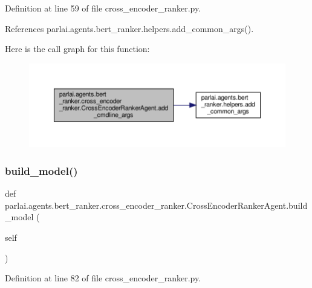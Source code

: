 Definition at line 59 of file cross\+\_\+encoder\+\_\+ranker.\+py.



References parlai.\+agents.\+bert\+\_\+ranker.\+helpers.\+add\+\_\+common\+\_\+args().

Here is the call graph for this function\+:
\nopagebreak
\begin{figure}[H]
\begin{center}
\leavevmode
\includegraphics[width=350pt]{classparlai_1_1agents_1_1bert__ranker_1_1cross__encoder__ranker_1_1CrossEncoderRankerAgent_a15c4f37715a216f5a4f37f5dbcb446f5_cgraph}
\end{center}
\end{figure}
\mbox{\label{classparlai_1_1agents_1_1bert__ranker_1_1cross__encoder__ranker_1_1CrossEncoderRankerAgent_a0754f7cf281a0223667ffb82c846a843}} 
\subsubsection{\texorpdfstring{build\+\_\+model()}{build\_model()}}
{\footnotesize\ttfamily def parlai.\+agents.\+bert\+\_\+ranker.\+cross\+\_\+encoder\+\_\+ranker.\+Cross\+Encoder\+Ranker\+Agent.\+build\+\_\+model (\begin{DoxyParamCaption}\item[{}]{self }\end{DoxyParamCaption})}



Definition at line 82 of file cross\+\_\+encoder\+\_\+ranker.\+py.



